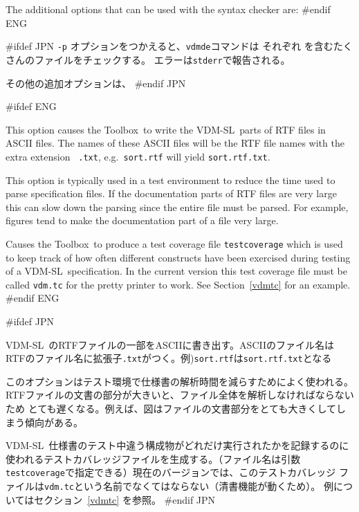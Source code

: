 \documentclass[\pformat,12pt]{article}
\newcommand{\vdmslpp}{VDM-SL}
\newcommand{\Toolbox}{Toolbox}
\newcommand{\vdmde}{vdmde}
\newcommand{\vdmslpp}{VDM++}
\newcommand{\Toolbox}{Toolbox}
\newcommand{\vdmde}{vppde}
\newcommand{\aaa}{\tt }
\begin{document}
The additional options that can be used with the syntax checker are:
#endif ENG

#ifdef JPN
{\tt -p} オプションをつかえると、{\tt \vdmde}コマンドは
それぞれ
を含むたくさんのファイルをチェックする。
エラーは{\aaa stderr}で報告される。

その他の追加オプションは、
#endif JPN

\begin{description}
#ifdef ENG
\item[{\tt -w}] This option causes the \Toolbox\ to write the
  \vdmslpp\ parts of RTF files in ASCII files. The names of these
  ASCII files will be the RTF file names with the extra extension {\tt
    .txt}, e.g.\ {\tt sort.rtf} will yield {\tt sort.rtf.txt}.
  
  This option is typically used in a test environment to reduce the
  time used to parse specification files. If the documentation parts
  of RTF files are very large this can slow down the parsing since
  the entire file must be parsed. For example, figures tend to make the
  documentation part of a file very large.

\item[{\tt -R}] Causes the \Toolbox\ to produce a test coverage file
  {\tt testcoverage} which is used to keep track of how often different
  constructs have been exercised during testing of a \vdmslpp\ 
  specification. In the current version this test coverage file must
  be called {\tt vdm.tc} for the pretty printer to work.  See
  Section~\ref{vdmtc} for an example.
#endif ENG

#ifdef JPN
\item[{\tt -w}]
   \vdmslpp\ のRTFファイルの一部をASCIIに書き出す。ASCIIのファイル名は
  RTFのファイル名に拡張子{\tt .txt}がつく。例){\tt sort.rtf}は{\tt sort.rtf.txt}となる

  このオプションはテスト環境で仕様書の解析時間を減らすためによく使われる。
  RTFファイルの文書の部分が大きいと、ファイル全体を解析しなければならないため
  とても遅くなる。例えば、図はファイルの文書部分をとても大きくしてしまう傾向がある。

\item[{\tt -R}]
   \vdmslpp\ 仕様書のテスト中違う構成物がどれだけ実行されたかを記録するのに
  使われるテストカバレッジファイルを生成する。（ファイル名は引数
  {\tt testcoverage}で指定できる）現在のバージョンでは、このテストカバレッジ
  ファイルは{\tt vdm.tc}という名前でなくてはならない（清書機能が動くため）。
  例についてはセクション~\ref{vdmtc} を参照。
#endif JPN
\end{description}
\end{document}
